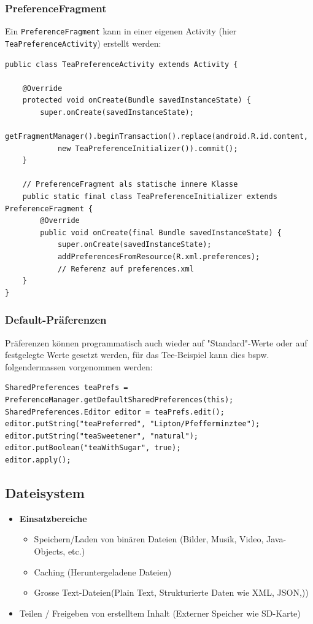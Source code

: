 \documentclass[a4paper]{article}
\begin{document}
\newpage

\subsubsection{PreferenceFragment}

Ein \texttt{PreferenceFragment} kann in einer eigenen Activity (hier \texttt{TeaPreferenceActivity}) erstellt werden:

\begin{lstlisting}
public class TeaPreferenceActivity extends Activity {

	@Override
	protected void onCreate(Bundle savedInstanceState) {
		super.onCreate(savedInstanceState);
		getFragmentManager().beginTransaction().replace(android.R.id.content,
			new TeaPreferenceInitializer()).commit();
	}
	
	// PreferenceFragment als statische innere Klasse
	public static final class TeaPreferenceInitializer extends PreferenceFragment {
		@Override
		public void onCreate(final Bundle savedInstanceState) {
			super.onCreate(savedInstanceState);
			addPreferencesFromResource(R.xml.preferences);
			// Referenz auf preferences.xml
	}
}
\end{lstlisting}

\subsubsection{Default-Präferenzen}

Präferenzen können programmatisch auch wieder auf "Standard"-Werte oder auf festgelegte Werte gesetzt werden, für das Tee-Beispiel kann dies bspw. folgendermassen vorgenommen werden:

\begin{lstlisting}
SharedPreferences teaPrefs = PreferenceManager.getDefaultSharedPreferences(this);
SharedPreferences.Editor editor = teaPrefs.edit();
editor.putString("teaPreferred", "Lipton/Pfefferminztee");
editor.putString("teaSweetener", "natural");
editor.putBoolean("teaWithSugar", true);
editor.apply();
\end{lstlisting}

\newpage
	
\subsection{Dateisystem}

\begin{itemize}
	\item \textbf{Einsatzbereiche}
		\begin{itemize}
			\item Speichern/Laden von binären Dateien (Bilder, Musik, Video, Java-Objects, etc.)
			\item Caching (Heruntergeladene Dateien)
			\item Grosse Text-Dateien(Plain Text, Strukturierte Daten wie XML, JSON,))
		\end{itemize}
	\item Teilen / Freigeben von erstelltem Inhalt (Externer Speicher wie SD-Karte)
\end{itemize}
\end{document}
